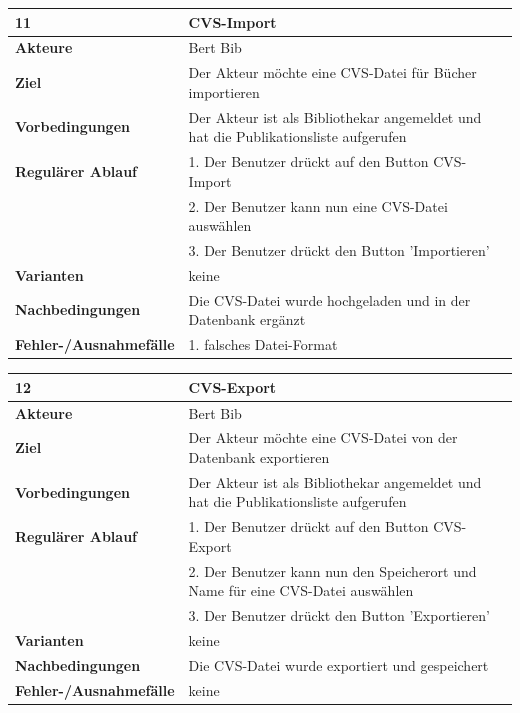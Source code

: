 \documentclass[fontsize=12pt,paper=a4,twoside]{scrartcl}
\begin{document}
\begin{table}[htbp]
\label{11}
\begin{tabular}{|l|p{10cm}|}
\hline 
\textbf{11} & \textbf{CVS-Import} \\ \hline
\textbf{Akteure} & Bert Bib\\ \hline
\textbf{Ziel} & Der Akteur möchte eine CVS-Datei für Bücher importieren \\ \hline
\textbf{Vorbedingungen} & Der Akteur ist als Bibliothekar angemeldet und hat die Publikationsliste 
aufgerufen \\ \hline
\textbf{Regulärer Ablauf} & 
1. Der Benutzer drückt auf den Button CVS-Import \\
&2. Der Benutzer kann nun eine CVS-Datei auswählen\\
&3. Der Benutzer drückt den Button 'Importieren'\\
\hline
\textbf{Varianten} & 
keine \\ \hline
\textbf{Nachbedingungen} & Die CVS-Datei wurde hochgeladen und in der Datenbank ergänzt\\\hline
\textbf{Fehler-/Ausnahmefälle} & 1. falsches Datei-Format\\
\hline
\end{tabular}
\end{table}

\newpage
\begin{table}[htbp]
\label{12}
\begin{tabular}{|l|p{10cm}|}
\hline 
\textbf{12} & \textbf{CVS-Export} \\ \hline
\textbf{Akteure} & Bert Bib\\ \hline
\textbf{Ziel} & Der Akteur möchte eine CVS-Datei von der Datenbank exportieren \\ \hline
\textbf{Vorbedingungen} & Der Akteur ist als Bibliothekar angemeldet und hat die Publikationsliste 
aufgerufen \\ \hline
\textbf{Regulärer Ablauf} & 
1. Der Benutzer drückt auf den Button CVS-Export \\
&2. Der Benutzer kann nun den Speicherort und Name für eine CVS-Datei auswählen\\
&3. Der Benutzer drückt den Button 'Exportieren'\\
\hline
\textbf{Varianten} & 
keine \\ \hline
\textbf{Nachbedingungen} & Die CVS-Datei wurde exportiert und gespeichert\\ \hline
\textbf{Fehler-/Ausnahmefälle} & keine\\
\hline
\end{tabular}
\end{table}
\end{document}
